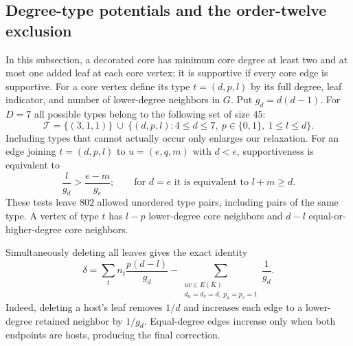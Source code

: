 \documentclass[11pt,a4paper]{article}
\theoremstyle{definition}\newtheorem{definition}[theorem]{Definition}
\theoremstyle{remark}\newtheorem{remark}[theorem]{Remark}
\begin{document}
\subsection{Degree-type potentials and the order-twelve exclusion}

In this subsection, a decorated core has minimum core degree at least
two and at most one added leaf at each core vertex; it is supportive
if every core edge is supportive. For a core vertex define its type
$t=(d,p,l)$ by its full degree, leaf indicator, and number of
lower-degree neighbors in $G$. Put $g_d=d(d-1)$.
For $D=7$ all possible types belong to the following set of size $45$:
\[
 \mathcal T=\{(3,1,1)\}\ \cup\
 \{(d,p,l):4\le d\le7,\ p\in\{0,1\},\ 1\le l\le d\}.
\]
Including types that cannot actually occur only enlarges our relaxation.
For an edge joining $t=(d,p,l)$ to $u=(e,q,m)$ with $d<e$,
supportiveness is equivalent to
\begin{equation}\label{eq:g7-compatible}
 \frac{l}{g_d}>\frac{e-m}{g_e};
 \qquad\text{for }d=e\text{ it is equivalent to }l+m\ge d.
\end{equation}
These tests leave $802$ allowed unordered type pairs, including pairs
of the same type. A vertex of type $t$ has $l-p$ lower-degree core
neighbors and $d-l$ equal-or-higher-degree core neighbors.

Simultaneously deleting all leaves gives the exact identity
\begin{equation}\label{eq:g7-delta}
 \delta=\sum_t n_t\frac{p(d-l)}{g_d}
 -\sum_{\substack{uv\in E(K)\\d_u=d_v=d,\ p_u=p_v=1}}\frac1{g_d}.
\end{equation}
Indeed, deleting a host's leaf removes $1/d$ and increases each edge
to a lower-degree retained neighbor by $1/g_d$. Equal-degree edges
increase only when both endpoints are hosts, producing the final
correction.
\end{document}
